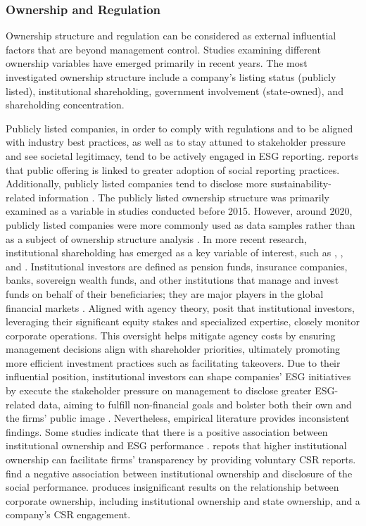 \documentclass[
  authoryear]{elsarticle}
\begin{document}
\subsubsection{Ownership and Regulation}\label{ownership-and-regulation}

Ownership structure and regulation can be considered as external
influential factors that are beyond management control. Studies
examining different ownership variables have emerged primarily in recent
years. The most investigated ownership structure include a company's
listing status (publicly listed), institutional shareholding, government
involvement (state-owned), and shareholding concentration.

Publicly listed companies, in order to comply with regulations and to be
aligned with industry best practices, as well as to stay attuned to
stakeholder pressure and see societal legitimacy, tend to be actively
engaged in ESG reporting. \citet{HADDOCK2005} reports that public
offering is linked to greater adoption of social reporting practices.
Additionally, publicly listed companies tend to disclose more
sustainability-related information \citep{GAMERSCHLAG2011}. The publicly
listed ownership structure was primarily examined as a variable in
studies conducted before 2015. However, around 2020, publicly listed
companies were more commonly used as data samples rather than as a
subject of ownership structure analysis
\citep[e.g.][]{SAHASRANAMAM2020, AMEEN2022, ALOBAID2024}. In more recent
research, institutional shareholding has emerged as a key variable of
interest, such as \citet{DYCK2019}, \citet{CHEN2020}, and
\citet{AMEEN2022}. Institutional investors are defined as pension funds,
insurance companies, banks, sovereign wealth funds, and other
institutions that manage and invest funds on behalf of their
beneficiaries; they are major players in the global financial markets
\citep{AMEEN2022}. Aligned with agency theory, \citet{SHLEIFER1986}
posit that institutional investors, leveraging their significant equity
stakes and specialized expertise, closely monitor corporate operations.
This oversight helps mitigate agency costs by ensuring management
decisions align with shareholder priorities, ultimately promoting more
efficient investment practices such as facilitating takeovers. Due to
their influential position, institutional investors can shape companies'
ESG initiatives by execute the stakeholder pressure on management to
disclose greater ESG-related data, aiming to fulfill non-financial goals
and bolster both their own and the firms' public image
\citep{DYCK2019, GARCIA-SANCHEZ2020}. Nevertheless, empirical literature
provides inconsistent findings. Some studies indicate that there is a
positive association between institutional ownership and ESG performance
\citep{DYCK2019, CHEN2020, AMEEN2022, RAIMO2020}. \citet{ZHOU2019}
repots that higher institutional ownership can facilitate firms'
transparency by providing voluntary CSR reports. \citet{ALUCHNA2022}
find a negative association between institutional ownership and
disclosure of the social performance. \citet{QU2007} produces
insignificant results on the relationship between corporate ownership,
including institutional ownership and state ownership, and a company's
CSR engagement.
\end{document}
